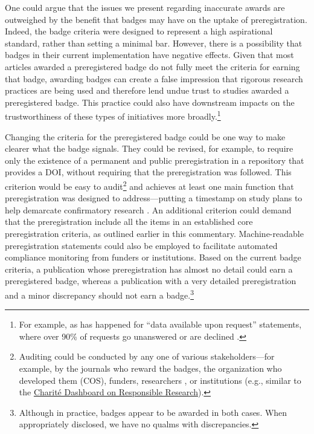 \documentclass[authordate, meta, issue]{jote-new-article}
\begin{document}
One could argue that the issues we present regarding inaccurate awards are outweighed by the benefit that badges may have on the uptake of preregistration. Indeed, the badge criteria were designed to represent a high aspirational standard, rather than setting a minimal bar. However, there is a possibility that badges in their current implementation have negative effects. Given that most articles awarded a preregistered badge do not fully meet the criteria for earning that badge, awarding badges can create a false impression that rigorous research practices are being used and therefore lend undue trust to studies awarded a preregistered badge. This practice could also have downstream impacts on the trustworthiness of these types of initiatives more broadly.\footnote{ For example, as has happened for “data available upon request” statements, where over 90\% of requests go unanswered or are declined \parencites{Gabelica2022}.}







Changing the criteria for the preregistered badge could be one way to make clearer what the badge signals. They could be revised, for example, to require only the existence of a permanent and public preregistration in a repository that provides a DOI, without requiring that the preregistration was followed. This criterion would be easy to audit\footnote{ Auditing could be conducted by any one of various stakeholders—for example, by the journals who reward the badges, the organization who developed them (COS), funders, researchers \parencites[e.g., similar to the \href{http://web.archive.org/save/https://fdaaa.trialstracker.net/}{FDAAA Trials Tracker}][]{DeVito2019}, or institutions (e.g., similar to the \href{http://web.archive.org/save/https://quest-dashboard.charite.de/}{Charité Dashboard on Responsible Research}).} and achieves at least one main function that preregistration was designed to address—putting a timestamp on study plans to help demarcate confirmatory research \parencites{Nosek2018}. An additional criterion could demand that the preregistration include all the items in an established core preregistration criteria, as outlined earlier in this commentary. Machine-readable preregistration statements could also be employed to facilitate automated compliance monitoring from funders or institutions. Based on the current badge criteria, a publication whose preregistration has almost no detail could earn a preregistered badge, whereas a publication with a very detailed preregistration and a minor discrepancy should not earn a badge.\footnote{ Although in practice, badges appear to be awarded in both cases. When appropriately disclosed, we have no qualms with discrepancies.}
\end{document}

